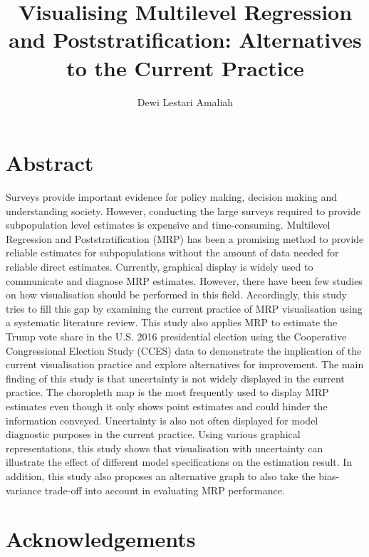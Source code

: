 \documentclass{monashthesis}
\author{Dewi Lestari Amaliah}
\title{Visualising Multilevel Regression and Poststratification: Alternatives to the Current Practice}
\begin{document}

\titlepage

{\sf\tighttoc\doublespacing}

\clearpage{}\setcounter{page}{0}

\hypertarget{abstract}{%
\chapter*{Abstract}\label{abstract}}

Surveys provide important evidence for policy making, decision making and understanding society. However, conducting the large surveys required to provide subpopulation level estimates is expensive and time-consuming. Multilevel Regression and Poststratification (MRP) has been a promising method to provide reliable estimates for subpopulations without the amount of data needed for reliable direct estimates. Currently, graphical display is widely used to communicate and diagnose MRP estimates. However, there have been few studies on how visualisation should be performed in this field. Accordingly, this study tries to fill this gap by examining the current practice of MRP visualisation using a systematic literature review. This study also applies MRP to estimate the Trump vote share in the U.S. 2016 presidential election using the Cooperative Congressional Election Study (CCES) data to demonstrate the implication of the current visualisation practice and explore alternatives for improvement. The main finding of this study is that uncertainty is not widely displayed in the current practice. The choropleth map is the most frequently used to display MRP estimates even though it only shows point estimates and could hinder the information conveyed. Uncertainty is also not often displayed for model diagnostic purposes in the current practice. Using various graphical representations, this study shows that visualisation with uncertainty can illustrate the effect of different model specifications on the estimation result. In addition, this study also proposes an alternative graph to also take the bias-variance trade-off into account in evaluating MRP performance.\\
\newpage

\hypertarget{acknowledgements}{%
\chapter*{Acknowledgements}\label{acknowledgements}}
\end{document}
